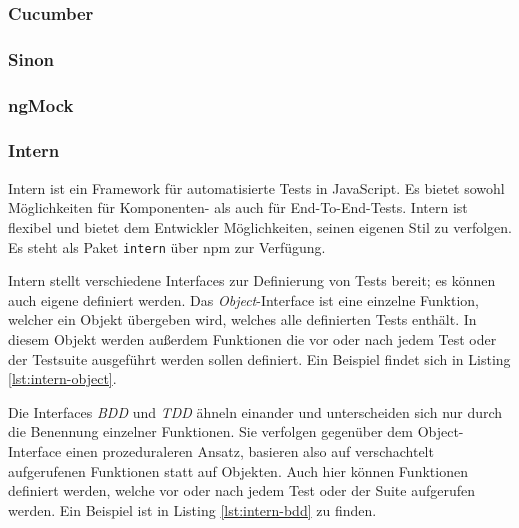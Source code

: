 \begin{figure}[H]
	
\end{figure}


\subsubsection{Cucumber}
\label{sec:Cucumber}

\subsubsection{Sinon}
\label{sec:Sinon}

\subsubsection{ngMock}
\label{sec:ngMock}

\subsubsection{Intern}
\label{sec:Intern}
Intern ist ein Framework für automatisierte Tests in JavaScript. Es bietet sowohl Möglichkeiten für Komponenten- als auch für End-To-End-Tests. Intern ist flexibel und bietet dem Entwickler Möglichkeiten, seinen eigenen Stil zu verfolgen. Es steht als Paket \texttt{intern} über npm zur Verfügung.\cite{intern-userguide}

Intern stellt verschiedene Interfaces zur Definierung von Tests bereit; es können auch eigene definiert werden. Das \textit{Object}-Interface ist eine einzelne Funktion, welcher ein Objekt übergeben wird, welches alle definierten Tests enthält. In diesem Objekt werden außerdem Funktionen die vor oder nach jedem Test oder der Testsuite ausgeführt werden sollen definiert. Ein Beispiel findet sich in Listing \ref{lst:intern-object}.\cite{intern-userguide}

\begin{figure}[H]
	
\end{figure}

Die Interfaces \textit{BDD} und \textit{TDD} ähneln einander und unterscheiden sich nur durch die Benennung einzelner Funktionen. Sie verfolgen gegenüber dem Object-Interface einen prozeduraleren Ansatz, basieren also auf verschachtelt aufgerufenen Funktionen statt auf Objekten. Auch hier können Funktionen definiert werden, welche vor oder nach jedem Test oder der Suite aufgerufen werden. Ein Beispiel ist in Listing \ref{lst:intern-bdd} zu finden.\cite{intern-userguide}

